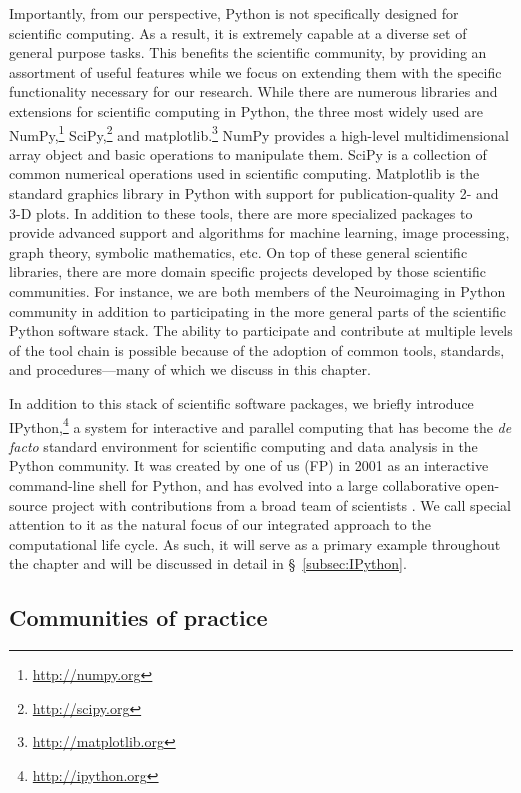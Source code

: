 \documentclass[11pt,oneside,english]{article}
\begin{document}
Importantly, from our perspective, Python is not specifically designed for
scientific computing.  As a result, it is extremely capable at a diverse set of
general purpose tasks. This benefits the scientific community, by providing an
assortment of useful features while we focus on extending them with the
specific functionality necessary for our research.  While there are numerous
libraries and extensions for scientific computing in Python, the three most
widely used are NumPy,\footnote{\url{http://numpy.org}}
SciPy,\footnote{\url{http://scipy.org}} and
matplotlib.\footnote{\url{http://matplotlib.org}}  NumPy \cite{van2011numpy}
provides a high-level multidimensional array object and basic operations to
manipulate them. SciPy is a collection of common numerical operations used in
scientific computing.  Matplotlib \cite{hunter2007matplotlib,
hunter2012matplotlib} is the standard graphics library in Python with support
for publication-quality 2- and 3-D plots. In addition to these tools, there are
more specialized packages to provide advanced support and algorithms for
machine learning, image processing, graph theory, symbolic mathematics, etc. On
top of these general scientific libraries, there are more domain specific
projects developed by those scientific communities. For instance, we are both
members of the Neuroimaging in Python \cite{MIL-BRE:2007} community in addition
to participating in the more general parts of the scientific Python software
stack. The ability to participate and contribute at multiple levels of the tool
chain is possible because of the adoption of common tools, standards, and
procedures---many of which we discuss in this chapter.

In addition to this stack of scientific software packages, we briefly
introduce IPython,\footnote{\url{http://ipython.org}} a system for interactive
and parallel computing that has become the \emph{de facto} standard environment
for scientific computing and data analysis in the Python community.  It was
created by one of us (FP) in 2001 as an interactive command-line shell for
Python, and has evolved into a large collaborative open-source project with
contributions from a broad team of scientists \cite{PER-GRA:2007}. We call
special attention to it as the natural focus of our integrated approach to the
computational life cycle. As such, it will serve as a primary example
throughout the chapter and will be discussed in detail in §~\ref{subsec:IPython}.

\subsection{\label{subsec:community}Communities of practice}
\end{document}
